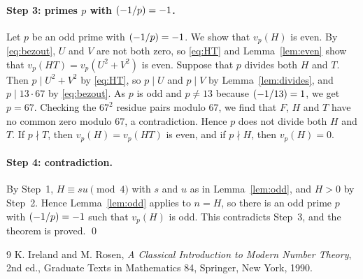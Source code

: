 \documentclass[11pt]{article}
\newcommand{\leg}[2]{\mathchoice{\biggl(\dfrac{#1}{#2}\biggr)}{(#1/#2)}{(#1/#2)}{(#1/#2)}}
\begin{document}
\paragraph{\texorpdfstring{Step 3: primes $p$ with $\leg{-1}{p}=-1$.}{Step 3: inert primes.}} Let $p$ be an odd prime with $\leg{-1}{p}=-1$. We show that $v_p(H)$ is even. By \eqref{eq:bezout}, $U$ and $V$ are not both zero, so \eqref{eq:HT} and Lemma~\ref{lem:even} show that $v_p(HT)=v_p(U^2+V^2)$ is even. Suppose that $p$ divides both $H$ and $T$. Then $p\mid U^2+V^2$ by \eqref{eq:HT}, so $p\mid U$ and $p\mid V$ by Lemma~\ref{lem:divides}, and $p\mid 13\cdot 67$ by \eqref{eq:bezout}. As $p$ is odd and $p\neq13$ because $\leg{-1}{13}=1$, we get $p=67$. Checking the $67^2$ residue pairs modulo $67$, we find that $F$, $H$ and $T$ have no common zero modulo $67$, a contradiction. Hence $p$ does not divide both $H$ and $T$. If $p\nmid T$, then $v_p(H)=v_p(HT)$ is even, and if $p\nmid H$, then $v_p(H)=0$.

\paragraph{Step 4: contradiction.} By Step~1, $H\equiv su\pmod{4}$ with $s$ and $u$ as in Lemma~\ref{lem:odd}, and $H>0$ by Step~2. Hence Lemma~\ref{lem:odd} applies to $n=H$, so there is an odd prime $p$ with $\leg{-1}{p}=-1$ such that $v_p(H)$ is odd. This contradicts Step~3, and the theorem is proved.
\qed

\begin{thebibliography}{9}
 K. Ireland and M. Rosen, \emph{A Classical Introduction to Modern Number Theory}, 2nd ed., Graduate Texts in Mathematics 84, Springer, New York, 1990.
\end{thebibliography}
\end{document}
